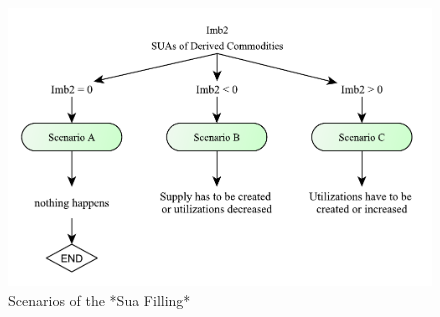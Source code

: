 \documentclass[]{article}
\begin{document}
\begin{figure}

{\centering \includegraphics[width=0.8\linewidth]{images/05_ScenariosFilling} 

}

\caption{\label{fig:f5}Scenarios of the *Sua Filling*}\label{fig:f5}
\end{figure}
\end{document}
